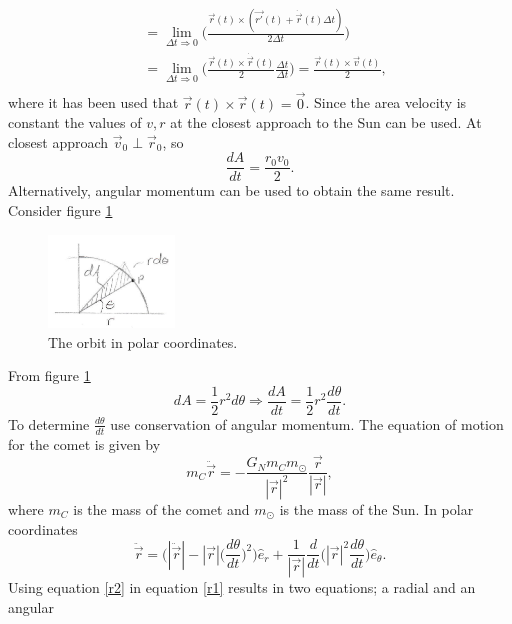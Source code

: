 \begin{example}
\begin{enumerate}
\begin{equation}
\begin{split}
				&=\lim\limits_{\Delta t\Rightarrow 0}\bigg(\frac{\vec{r}(t)\times (\vec{r'}(t)+\dot{\vec{r}}(t)\Delta t)}{2\Delta t}\bigg)\\
				&=\lim\limits_{\Delta t\Rightarrow 0}\bigg(\frac{\vec{r}(t)\times \dot{\vec{r}}(t)}{2}\frac{\Delta t}{\Delta t}\bigg)=\frac{\vec{r}(t)\times \vec{v}(t)}{2},\\
			\end{split}
		\end{equation} 
		where it has been used that $\vec{r}(t)\times \vec{r}(t)=\vec{0}$. Since the area velocity is constant the values of $v,r$ at the closest approach to the Sun can be used. At closest approach $\vec{v}_0\perp\vec{r}_0$, so
		\begin{equation}
			\frac{dA}{dt}=\frac{r_0v_0}{2}.
		\end{equation} 
		Alternatively, angular momentum can be used to obtain the same result. Consider figure \ref{fig:an}
		\begin{figure}[h]
			\captionsetup{width=1\textwidth}
			\centering
			\includegraphics[width=0.3\textwidth]{figures/an}
			\caption{The orbit in polar coordinates.}
			\label{fig:an}
		\end{figure}
		From figure \ref{fig:an}
		\begin{equation}
			dA=\frac{1}{2}r^2d\theta\Rightarrow \frac{dA}{dt}=\frac{1}{2}r^2\frac{d\theta}{dt}.
			\label{r4}
		\end{equation} 
		To determine $\frac{d\theta}{dt}$ use conservation of angular momentum. The equation of motion for the comet is given by
		\begin{equation}
			m_C\ddot{\vec{r}}=-\frac{G_Nm_Cm_\odot}{|\vec{r}|^2}\frac{\vec{r}}{|\vec{r}|},
			\label{r1}
		\end{equation} 
		where $m_C$ is the mass of the comet and $m_\odot$ is the mass of the Sun. In polar coordinates
		\begin{equation}
			\ddot{\vec{r}}=\bigg(|\ddot{\vec{r}}|-|\vec{r}|\bigg(\frac{d\theta}{dt}\bigg)^2\bigg)\hat{e}_r+\frac{1}{|\vec{r}|}\frac{d}{dt}\bigg(|\vec{r}|^2\frac{d\theta}{dt}\bigg)\hat{e}_\theta.
			\label{r2}
		\end{equation} 
		Using equation \eqref{r2} in equation \eqref{r1} results in two equations; a radial and an angular

\end{enumerate}
\end{example}
